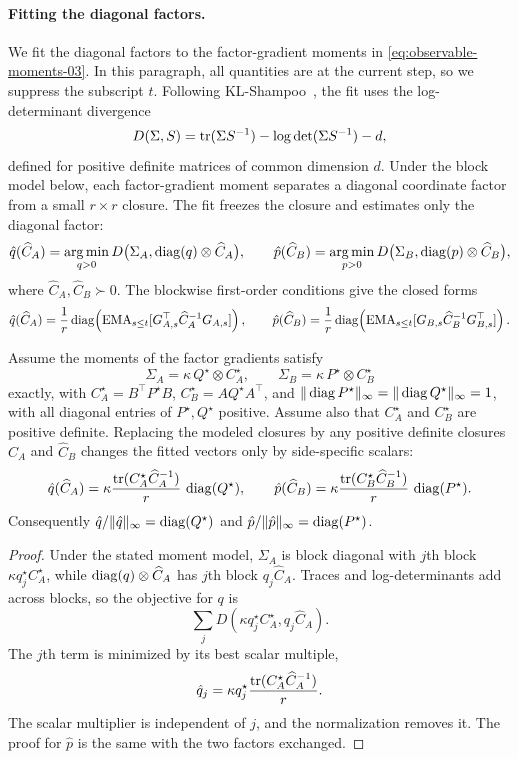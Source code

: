 \paragraph{Fitting the diagonal factors.}
We fit the diagonal factors to the factor-gradient moments in
\eqref{eq:observable-moments-03}. In this paragraph, all quantities are
at the current step, so we suppress the subscript $t$. Following
KL-Shampoo~\cite{klshampoo}, the fit uses the log-determinant
divergence~\cite{logdetdiv}
\[
  D(\Sigma,S)=\operatorname{tr}(\Sigma S^{-1})-\log\det(\Sigma S^{-1})-d,
\]
defined for positive definite matrices of common dimension $d$.
Under the block model below, each factor-gradient moment separates a diagonal
coordinate factor from a small $r\times r$ closure. The fit freezes the
closure and estimates only the diagonal factor:
\begin{equation}\label{eq:factor-fit-03}
  \hat{q}(\widehat C_A)
  =
  \operatorname*{arg\,min}_{q>0}
  D\bigl(\Sigma_A,\operatorname{diag}(q)\otimes\widehat C_A\bigr),
  \qquad
  \hat{p}(\widehat C_B)
  =
  \operatorname*{arg\,min}_{p>0}
  D\bigl(\Sigma_B,\operatorname{diag}(p)\otimes\widehat C_B\bigr),
\end{equation}
where $\widehat C_A,\widehat C_B\succ0$. The blockwise first-order
conditions give the closed forms
\[
  \hat{q}(\widehat C_A)
  =
  \frac1r\operatorname{diag}\!\left(
    \operatorname{EMA}_{s\le t}[G_{A,s}^\top\widehat C_A^{-1}G_{A,s}]
  \right),
  \qquad
  \hat{p}(\widehat C_B)
  =
  \frac1r\operatorname{diag}\!\left(
    \operatorname{EMA}_{s\le t}[G_{B,s}\widehat C_B^{-1}G_{B,s}^\top]
  \right).
\]

\begin{lemma}\label{lem:closure-invariance-03}
Assume the moments of the factor gradients satisfy
\[
  \Sigma_A=\kappa\,Q^\star\otimes C^\star_A,
  \qquad
  \Sigma_B=\kappa\,P^\star\otimes C^\star_B
\]
exactly, with
$C^\star_A=B^\top P^\star B$,
$C^\star_B=AQ^\star A^\top$, and
$\| \operatorname{diag} P^\star\|_\infty=\| \operatorname{diag} Q^\star\|_\infty=1$, with all
diagonal entries of $P^\star,Q^\star$ positive. Assume also that
$C^\star_A$ and $C^\star_B$ are positive definite.
Replacing the modeled closures by any positive definite closures
$\widehat C_A$ and $\widehat C_B$ changes the fitted vectors only by
side-specific scalars:
\[
  \hat{q}(\widehat C_A)
  =
  \kappa\frac{\operatorname{tr}(C^\star_A\widehat C_A^{-1})}{r}\,\operatorname{diag}(Q^\star),
  \qquad
  \hat{p}(\widehat C_B)
  =
  \kappa\frac{\operatorname{tr}(C^\star_B\widehat C_B^{-1})}{r}\,\operatorname{diag}(P^\star).
\]
Consequently $\hat{q}/\| \hat{q}\|_\infty=\operatorname{diag}(Q^\star)$ and
$\hat{p}/\| \hat{p}\|_\infty=\operatorname{diag}(P^\star)$.
\end{lemma}
\begin{proof}
Under the stated moment model, $\Sigma_A$ is block diagonal
with $j$th block $\kappa q^\star_j C^\star_A$, while
$\operatorname{diag}(q)\otimes\widehat C_A$ has $j$th block $q_j\widehat C_A$.
Traces and log-determinants add across blocks, so the objective for
$q$ is
\[
  \sum_j D(\kappa q^\star_j C^\star_A, q_j\widehat C_A).
\]
The $j$th term is minimized by its best scalar multiple,
\[
  \hat q_j
  =
  \kappa q^\star_j
  \frac{\operatorname{tr}(C^\star_A\widehat C_A^{-1})}{r}.
\]
The scalar multiplier is independent of $j$, and the normalization removes it.
The proof for $\hat p$ is the same with the two factors exchanged.
\end{proof}

